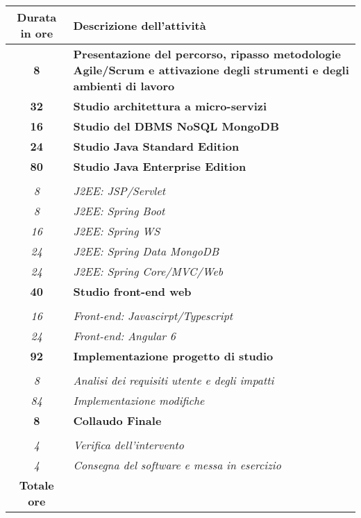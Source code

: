 

\begin{tabularx}{\textwidth}{|cX|}
	\hline
	\textbf{Durata in ore} & \textbf{Descrizione dell'attività} \\\hline

	\textbf{8} & \textbf{Presentazione del percorso, ripasso metodologie Agile/Scrum e attivazione degli strumenti e degli ambienti di lavoro} \\
\hline

    \textbf{32} & \textbf{Studio architettura a micro-servizi} \\\hline
    \textbf{16} & \textbf{Studio del DBMS NoSQL MongoDB}\\\hline
    \textbf{24} & \textbf{Studio Java Standard Edition}\\\hline

    \textbf{80} & \textbf{Studio Java Enterprise Edition}\\\hdashline
    \multirow{5}{0cm}\\
    \textit{8} &
    \textit{J2EE: JSP/Servlet}\\
    \textit{8} &
    \textit{J2EE: Spring Boot}\\
    \textit{16} &
    \textit{J2EE: Spring WS}\\
    \textit{24} &
    \textit{J2EE: Spring Data MongoDB}\\
    \textit{24} &
    \textit{J2EE: Spring Core/MVC/Web}\\\hline

    \textbf{40} & \textbf{Studio front-end web}\\\hdashline
    \multirow{2}{0cm}\\
    \textit{16} &
    \textit{Front-end: Javascirpt/Typescript}\\
    \textit{24} &
    \textit{Front-end: Angular 6}\\\hline

    \textbf{92} & \textbf{Implementazione progetto di studio}\\\hdashline
    \multirow{2}{0cm}\\
    \textit{8} &
    \textit{Analisi dei requisiti utente e degli impatti}\\
    \textit{84} &
    \textit{Implementazione modifiche} \\\hline

    \textbf{8} & \textbf{Collaudo Finale}\\\hdashline
    \multirow{2}{0cm}\\
    \textit{4} &
    \textit{Verifica dell'intervento}\\
    \textit{4} &
    \textit{Consegna del software e messa in esercizio} \\\hline

	\textbf{Totale ore} & \multicolumn{1}{c|}{\textbf{\totaleOre}} \\\hline


\end{tabularx}
